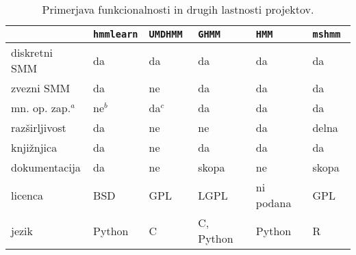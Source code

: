 \begin{table}
\begin{minipage}{\textwidth}
\small
\begin{tabular}{l lllll}
\toprule
                  & {\tt hmmlearn} & \tt{UMDHMM} & {\tt GHMM}& \tt{HMM} & \tt{mshmm} \\
\midrule
diskretni SMM     & da     & da      & da        & da        & da    \\
zvezni SMM        & da     & ne      & da        & da        & da    \\
mn. op. zap.$^a$  & ne$^b$ & da$^c$  & da        & da        & da    \\
razširljivost     & da     & ne      & ne        & da        & delna \\
knjižnjica        & da     & ne      & da        & da        & da    \\
dokumentacija     & da     & ne      & skopa     & ne        & skopa \\
licenca           & BSD    & GPL     & LGPL      & ni podana & GPL   \\
jezik             & Python & C       & C, Python & Python    & R     \\
\bottomrule
\end{tabular} \\
\vspace{6pt}{\footnotesize\indent \\
$\quad^a$ mnogotera opazovana zaporedja\\
$\quad^b$ Funkcija je sedaj že na voljo v novi različici knjižnjice. \\
$\quad^c$ Podpora za mnogotera opazovana zaporedja je omenjena v izvorni kodi, vendar uporabnik nima nadzora nad načinom, kako se vhod, ki je podan kot en niz, deli na več zaporedij.}
\caption{Primerjava funkcionalnosti in drugih lastnosti projektov.}
\label{tab:compare}
\end{minipage}
\end{table}
